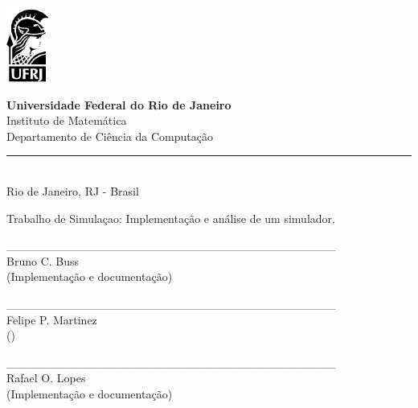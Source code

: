 \documentclass[a4paper,10pt]{article}
\begin{document}
\begin{titlepage}

\begin{minipage}{0.2\linewidth}
 \includegraphics[]{./minerva.png}
\end{minipage}
\begin{minipage}{0.8\linewidth}
 \textbf{Universidade Federal do Rio de Janeiro}\\
 Instituto de Matemática\\
 Departamento de Ciência da Computação\\
 \rule{0.8\linewidth}{0.5mm}\\
 Rio de Janeiro, RJ - Brasil
\end{minipage}

\begin{center}

\vspace{2cm}

\Large
Trabalho de Simulaçao: Implementação e análise de um simulador.

\vspace{1cm}

\large

\_\_\_\_\_\_\_\_\_\_\_\_\_\_\_\_\_\_\_\_\_\_\_\_\_\_\_\_\_\_\_\_\_\_\_\_\_\_\_\\
Bruno C. Buss\\(Implementação e documentação)\\

\vspace{0.5cm}

\_\_\_\_\_\_\_\_\_\_\_\_\_\_\_\_\_\_\_\_\_\_\_\_\_\_\_\_\_\_\_\_\_\_\_\_\_\_\_\\
Felipe P. Martinez\\()\\

\vspace{0.5cm}

\_\_\_\_\_\_\_\_\_\_\_\_\_\_\_\_\_\_\_\_\_\_\_\_\_\_\_\_\_\_\_\_\_\_\_\_\_\_\_\\
Rafael O. Lopes\\(Implementação e documentação)\\

\vspace{0.5cm}


\end{center}
\end{titlepage}
\end{document}
